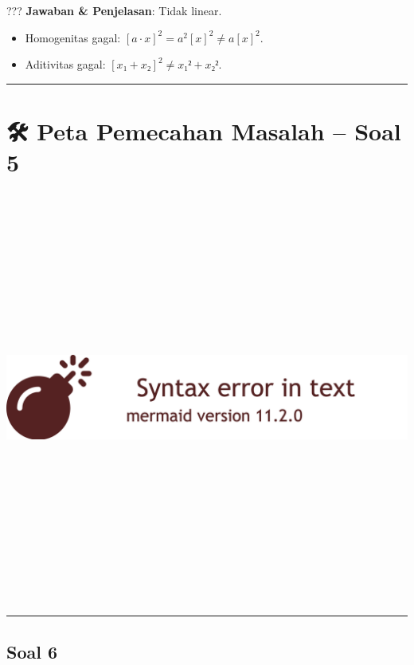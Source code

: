 \documentclass[
  letterpaper,
  DIV=11,
  numbers=noendperiod]{scrreprt}
\providecommand{\tightlist}{%
  \setlength{\itemsep}{0pt}\setlength{\parskip}{0pt}}
\begin{document}
??? \textbf{Jawaban \& Penjelasan}: Tidak linear.

\begin{itemize}
\tightlist
\item
  Homogenitas gagal: \([a·x]^2 = a^2[x]^2 \neq a[x]^2\).
\item
  Aditivitas gagal: \([x₁+x₂]^2 \neq x₁²+x₂²\).
\end{itemize}

\begin{center}\rule{0.5\linewidth}{0.5pt}\end{center}

\section{🛠️ Peta Pemecahan Masalah -- Soal
5}\label{peta-pemecahan-masalah-soal-5}

\includegraphics[width=25.13in,height=5.33in]{kuliah/Peta_1_files/figure-latex/mermaid-figure-3.png}

\begin{center}\rule{0.5\linewidth}{0.5pt}\end{center}

\subsection{Soal 6}\label{soal-6}
\end{document}
